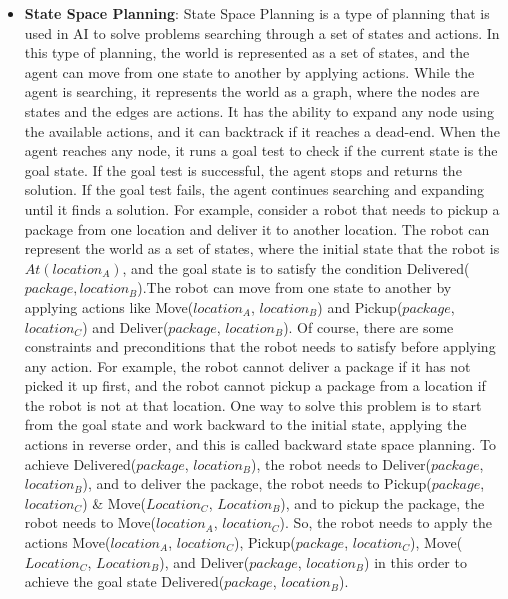 \begin{itemize}
      \item \label{def:state_space_planning}
            \textbf{State Space Planning}: State Space Planning is a type of planning that is used in \ac{AI} to solve problems searching through a set of states and actions. In this type of planning, the world is represented as a set of states, and the agent can move from one state to another by applying actions. While the agent is searching, it represents the world as a graph, where the nodes are states and the edges are actions. It has the ability to expand any node using the available actions, and it can backtrack if it reaches a dead-end. When the agent reaches any node, it runs a goal test to check if the current state is the goal state. If the goal test is successful, the agent stops and returns the solution. If the goal test fails, the agent continues searching and expanding until it finds a solution. For example, consider a robot that needs to pickup a package from one location and deliver it to another location. The robot can represent the world as a set of states, where the initial state that the robot is $At(location_A)$, and the goal state is to satisfy the condition Delivered($package, location_B$).The robot can move from one state to another by applying actions like Move($location_A$, $location_B$) and Pickup($package$, $location_C$) and Deliver($package$, $location_B$). Of course, there are some constraints and preconditions that the robot needs to satisfy before applying any action. For example, the robot cannot deliver a package if it has not picked it up first, and the robot cannot pickup a package from a location if the robot is not at that location. One way to solve this problem is to start from the goal state and work backward to the initial state, applying the actions in reverse order, and this is called backward state space planning. To achieve Delivered($package$, $location_B$), the robot needs to Deliver($package$, $location_B$), and to deliver the package, the robot needs to Pickup($package$, $location_C$) \& Move($Location_C$, $Location_B$), and to pickup the package, the robot needs to Move($location_A$, $location_C$). So, the robot needs to apply the actions Move($location_A$, $location_C$), Pickup($package$, $location_C$), Move($Location_C$, $Location_B$), and Deliver($package$, $location_B$) in this order to achieve the goal state Delivered($package$, $location_B$).


\end{itemize}
